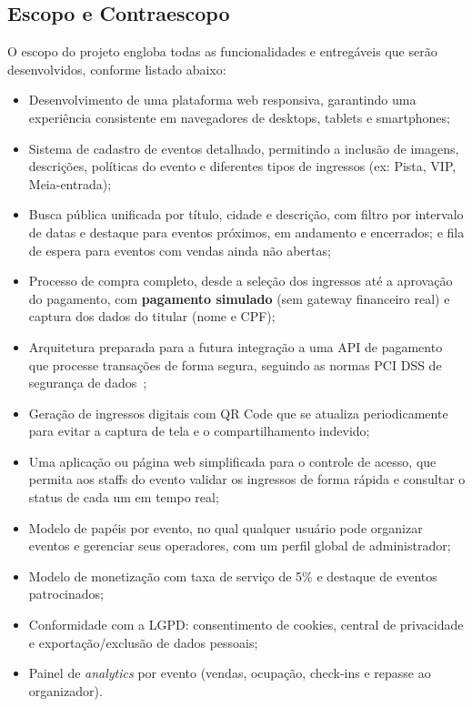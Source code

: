 \subsection{Escopo e Contraescopo}

O escopo do projeto engloba todas as funcionalidades e entregáveis que serão desenvolvidos, conforme listado abaixo:
\begin{itemize}
    \item Desenvolvimento de uma plataforma web responsiva, garantindo uma experiência consistente em navegadores de desktops, tablets e smartphones;
    \item Sistema de cadastro de eventos detalhado, permitindo a inclusão de imagens, descrições, políticas do evento e diferentes tipos de ingressos (ex: Pista, VIP, Meia-entrada);
    \item Busca pública unificada por título, cidade e descrição, com filtro por intervalo de datas e destaque para eventos próximos, em andamento e encerrados; e fila de espera para eventos com vendas ainda não abertas;
    \item Processo de compra completo, desde a seleção dos ingressos até a aprovação do pagamento, com \textbf{pagamento simulado} (sem gateway financeiro real) e captura dos dados do titular (nome e CPF);
    \item Arquitetura preparada para a futura integração a uma API de pagamento que processe transações de forma segura, seguindo as normas PCI DSS de segurança de dados~\cite{PCIDSS:2022};
    \item Geração de ingressos digitais com QR Code que se atualiza periodicamente para evitar a captura de tela e o compartilhamento indevido;
    \item Uma aplicação ou página web simplificada para o controle de acesso, que permita aos staffs do evento validar os ingressos de forma rápida e consultar o status de cada um em tempo real;
    \item Modelo de papéis por evento, no qual qualquer usuário pode organizar eventos e gerenciar seus operadores, com um perfil global de administrador;
    \item Modelo de monetização com taxa de serviço de 5\% e destaque de eventos patrocinados;
    \item Conformidade com a LGPD: consentimento de cookies, central de privacidade e exportação/exclusão de dados pessoais;
    \item Painel de \textit{analytics} por evento (vendas, ocupação, check-ins e repasse ao organizador).
\end{itemize}

